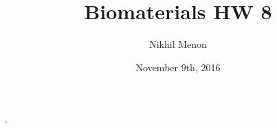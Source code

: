 \documentclass{article}
\title{Biomaterials HW 8}
\author{Nikhil Menon}
\date{November 9th, 2016}
\begin{document}
.
\end{document}

